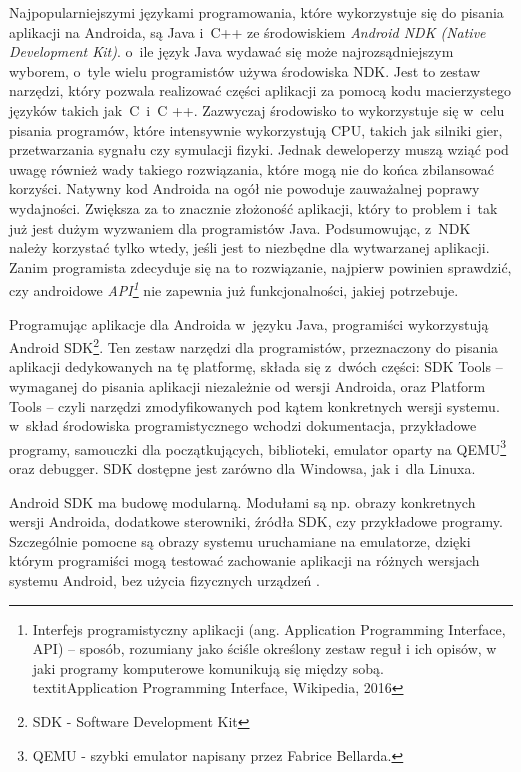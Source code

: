 Najpopularniejszymi językami programowania, które wykorzystuje się do pisania aplikacji na Androida, są Java i~C++ ze środowiskiem \textit{Android NDK (Native Development Kit)}. o~ile język Java wydawać się może najrozsądniejszym wyborem, o~tyle wielu programistów używa środowiska NDK. Jest to zestaw narzędzi, który pozwala realizować części aplikacji za pomocą kodu macierzystego języków takich jak~C~i~C ++. Zazwyczaj środowisko to wykorzystuje się w~celu pisania programów, które intensywnie wykorzystują CPU, takich jak silniki gier, przetwarzania sygnału czy symulacji fizyki. Jednak deweloperzy muszą wziąć pod uwagę również wady takiego rozwiązania, które mogą nie do końca zbilansować korzyści. Natywny kod Androida na ogół nie powoduje zauważalnej poprawy wydajności. Zwiększa za to znacznie złożoność aplikacji, który to problem i~tak już jest dużym wyzwaniem dla programistów Java. Podsumowując, z~NDK należy korzystać tylko wtedy, jeśli jest to niezbędne dla wytwarzanej aplikacji. Zanim programista zdecyduje się na to rozwiązanie, najpierw powinien sprawdzić, czy androidowe \textit{API\footnote{Interfejs programistyczny aplikacji (ang. Application Programming Interface, API) – sposób, rozumiany jako ściśle określony zestaw reguł i ich opisów, w jaki programy komputerowe komunikują się między sobą. \\textit{Application Programming Interface, Wikipedia, 2016}}} nie zapewnia już funkcjonalności, jakiej potrzebuje.

Programując aplikacje dla Androida w~języku Java, programiści wykorzystują Android SDK\footnote{SDK - Software Development Kit}. Ten zestaw narzędzi dla programistów, przeznaczony do pisania aplikacji dedykowanych na tę platformę, składa się z~dwóch części: SDK Tools – wymaganej do pisania aplikacji niezależnie od wersji Androida, oraz Platform Tools – czyli narzędzi zmodyfikowanych pod kątem konkretnych wersji systemu. w~skład środowiska programistycznego wchodzi dokumentacja, przykładowe programy, samouczki dla początkujących, biblioteki, emulator oparty na QEMU\footnote{QEMU - szybki emulator napisany przez Fabrice Bellarda.} oraz debugger. SDK dostępne jest zarówno dla Windowsa, jak i~dla Linuxa.

Android SDK ma budowę modularną. Modułami są np. obrazy konkretnych wersji Androida, dodatkowe sterowniki, źródła SDK, czy przykładowe programy. Szczególnie pomocne są obrazy systemu uruchamiane na emulatorze, dzięki którym programiści mogą  testować zachowanie aplikacji na różnych wersjach systemu Android, bez użycia fizycznych urządzeń \cite{website:android:sdk}.


